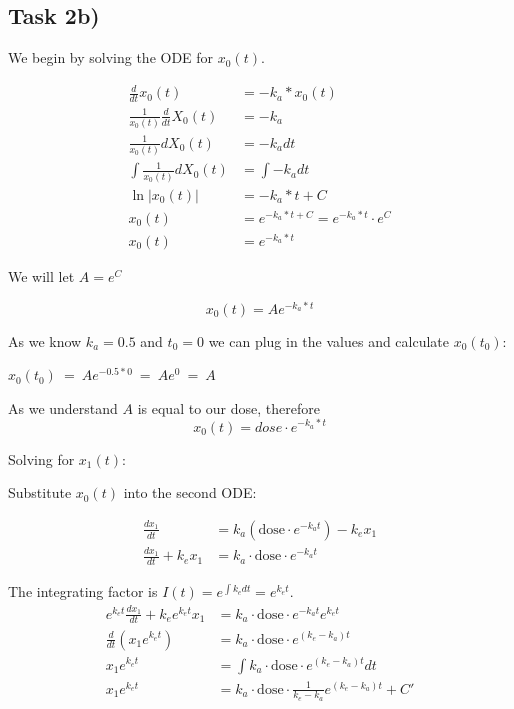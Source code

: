\documentclass[]{scrartcl}
\begin{document}

\subsection*{Task 2b)}


We begin by solving the ODE for $x_0(t)$.

\begin{align*}
	\frac{d}{dt} x_0(t) &= - k_a * x_0(t) \\
	\frac{1}{x_0(t)} \frac{d}{dt} X_0(t) &= - k_a \\
	\frac{1}{x_0(t)} d X_0(t) &= - k_a dt \\
	\int \frac{1}{x_0(t)} d X_0(t) &= \int - k_a dt \\
	\ln \vert x_0(t) \vert &= - k_a * t + C \\
	x_0(t) &= e^{- k_a * t + C} = e^{- k_a * t} \cdot e^C \\
	x_0(t) &= e^{- k_a * t}
\end{align*}

We will let $A = e^C$

$$
	x_0(t) = Ae^{- k_a * t}
$$

As we know $k_a = 0.5$ and $t_0 = 0$ we can plug in the values and calculate $x_0(t_0)$:

\begin{center}
	$x_0(t_0) ~ = ~ Ae^{- 0.5 * 0} ~ = ~ Ae^0 ~ = ~ A$
\end{center}

As we understand $A$ is equal to our dose, therefore
$$
	x_0(t) = dose \cdot e^{- k_a * t}
$$

Solving for $x_1(t)$:

Substitute $x_0(t)$ into the second ODE:

\begin{align*}
    \frac{dx_1}{dt} &= k_a (\text{dose} \cdot e^{-k_a t}) - k_e x_1\\
    \frac{dx_1}{dt} + k_e x_1 &= k_a \cdot \text{dose} \cdot e^{-k_a t}
\end{align*}

The integrating factor is $I(t) = e^{\int k_e dt} = e^{k_e t}$.
\begin{align*}
e^{k_e t} \frac{dx_1}{dt} + k_e e^{k_e t} x_1 &= k_a \cdot \text{dose} \cdot e^{-k_a t} e^{k_e t}\\
\frac{d}{dt}(x_1 e^{k_e t}) &= k_a \cdot \text{dose} \cdot e^{(k_e - k_a)t}\\
x_1 e^{k_e t} &= \int k_a \cdot \text{dose} \cdot e^{(k_e - k_a)t} dt \\
x_1 e^{k_e t} &= k_a \cdot \text{dose} \cdot \frac{1}{k_e - k_a} e^{(k_e - k_a)t} + C'
\end{align*}
\end{document}
